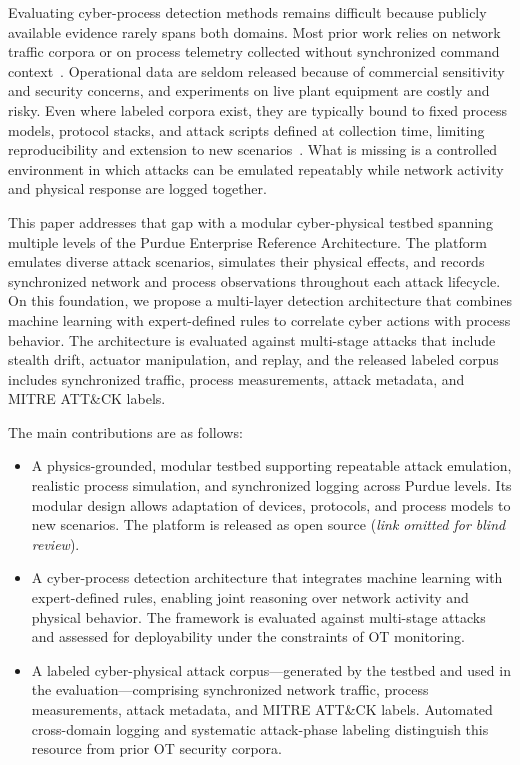 \documentclass[journal,twoside,web]{ieeecolor}
\begin{document}
Evaluating cyber-process detection methods remains difficult because publicly available evidence rarely spans both domains. Most prior work relies on network traffic corpora or on process telemetry collected without synchronized command context~\cite{conti2021survey}. Operational data are seldom released because of commercial sensitivity and security concerns, and experiments on live plant equipment are costly and risky. Even where labeled corpora exist, they are typically bound to fixed process models, protocol stacks, and attack scripts defined at collection time, limiting reproducibility and extension to new scenarios~\cite{conti2021survey}. What is missing is a controlled environment in which attacks can be emulated repeatably while network activity and physical response are logged together.

This paper addresses that gap with a modular cyber-physical testbed spanning multiple levels of the Purdue Enterprise Reference Architecture. The platform emulates diverse attack scenarios, simulates their physical effects, and records synchronized network and process observations throughout each attack lifecycle. On this foundation, we propose a multi-layer detection architecture that combines machine learning with expert-defined rules to correlate cyber actions with process behavior. The architecture is evaluated against multi-stage attacks that include stealth drift, actuator manipulation, and replay, and the released labeled corpus includes synchronized traffic, process measurements, attack metadata, and MITRE ATT\&CK labels.

The main contributions are as follows:
\begin{itemize}
    \item A physics-grounded, modular testbed supporting repeatable attack emulation, realistic process simulation, and synchronized logging across Purdue levels. Its modular design allows adaptation of devices, protocols, and process models to new scenarios. The platform is released as open source (\emph{link omitted for blind review}).

    \item A cyber-process detection architecture that integrates machine learning with expert-defined rules, enabling joint reasoning over network activity and physical behavior. The framework is evaluated against multi-stage attacks and assessed for deployability under the constraints of OT monitoring.

    \item A labeled cyber-physical attack corpus---generated by the testbed and used in the evaluation---comprising synchronized network traffic, process measurements, attack metadata, and MITRE ATT\&CK labels. Automated cross-domain logging and systematic attack-phase labeling distinguish this resource from prior OT security corpora.
\end{itemize}
\end{document}
